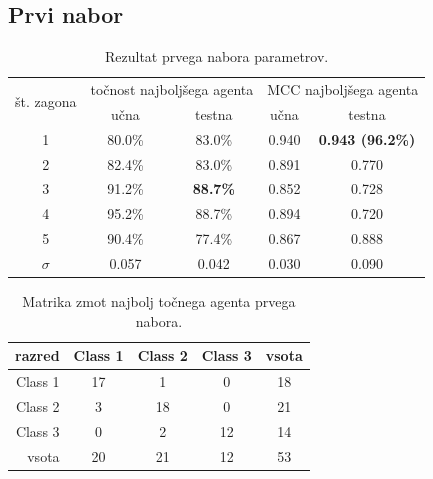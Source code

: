 \subsection{Prvi nabor}\label{subsec:dodatek-wine-prvi-nabor}
\begin{table}[H]
    \begin{center}
        \begin{tabular}{|| c | c c || c c ||}
            \hline
            \multirow{2}{*}{št. zagona} & \multicolumn{2}{c||}{točnost najboljšega agenta} & \multicolumn{2}{c||}{MCC najboljšega agenta} \\ \cline{2-5}
            & učna   & testna          & učna  & testna                  \\
            \hline
            1        & 80.0\% & 83.0\%          & 0.940 & \textbf{0.943 (96.2\%)} \\
            \hline
            2        & 82.4\% & 83.0\%          & 0.891 & 0.770                   \\
            \hline
            3        & 91.2\% & \textbf{88.7\%} & 0.852 & 0.728                   \\
            \hline
            4        & 95.2\% & 88.7\%          & 0.894 & 0.720                   \\
            \hline
            5        & 90.4\% & 77.4\%          & 0.867 & 0.888                   \\
            \hline
            $\sigma$ & 0.057  & 0.042           & 0.030 & 0.090                   \\
            \hline
        \end{tabular}
    \end{center}
    \caption{Rezultat prvega nabora parametrov.}
    \label{tab:wine_result_1}
\end{table}

\begin{table}[H]
    \centering
    \begin{tabular}{||rcccc||}
        \hline
        razred  & Class 1 & Class 2 & Class 3 & vsota \\ \hline
        Class 1 & 17      & 1       & 0       & 18    \\ \hline
        Class 2 & 3       & 18      & 0       & 21    \\ \hline
        Class 3 & 0       & 2       & 12      & 14    \\ \hline
        vsota   & 20      & 21      & 12      & 53    \\ \hline
    \end{tabular}
    \caption{Matrika zmot najbolj točnega agenta prvega nabora.}
    \label{tab:wine_acc_1}
\end{table}

